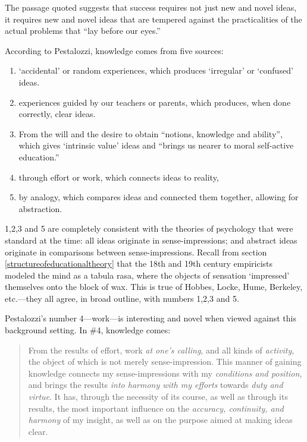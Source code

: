 The passage quoted suggests that success requires not just new and novel ideas, it requires new and novel ideas that are tempered against the practicalities of the actual problems that ``lay before our eyes.'' 

According to Pestalozzi, knowledge comes from five sources: 

\begin{enumerate}
\item `accidental' or random experiences, which produces `irregular' or `confused' ideas.

\item experiences guided by our teachers or parents, which produces, when done correctly, clear ideas.

\item From the will and the desire to obtain ``notions, knowledge and ability'', which gives `intrinsic value' ideas and ``brings us nearer to moral self-active education.''

\item through effort or work, which connects ideas to reality,

\item by analogy, which compares ideas and connected them together, allowing for abstraction. 

\end{enumerate}

1,2,3 and 5 are completely consistent with the theories of psychology that were standard at the time: all ideas originate in sense-impressions; and abstract ideas originate in comparisons between sense-impressions. Recall from section \ref{structureofeducationaltheory} that the 18th and 19th century empiricists modeled the mind as a tabula rasa, where the objects of sensation `impressed' themselves onto the block of wax. This is true of Hobbes, Locke, Hume, Berkeley, etc.---they all agree, in broad outline, with numbers 1,2,3 and 5.

Pestalozzi's number 4---work---is interesting and novel when viewed against this background setting. In \#4, knowledge comes:

\begin{quote}

From the results of effort, work \emph{at one's calling}, and all kinds of \emph{activity}, the object of which is not merely sense-impression. This manner of gaining knowledge connects my sense-impressions with my \emph{conditions and position}, and brings the results \emph{into harmony with my efforts} towards \emph{duty and virtue}. It has, through the necessity of its course, as well as through its results, the most important influence on the \emph{accuracy, continuity, and harmony} of my insight, as well as on the purpose aimed at making ideas clear. ~\citep[p. 115, italics mine]{Pestalozzi:1894vz} 
\end{quote}

